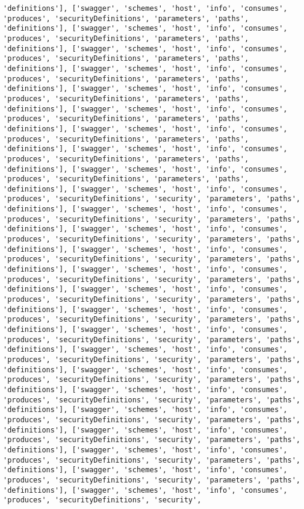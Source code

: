 \documentclass[11pt]{article}
\begin{document}
\begin{Verbatim}[commandchars=\\\{\}]
'definitions'], ['swagger', 'schemes', 'host', 'info', 'consumes', 'produces', 'securityDefinitions', 'parameters', 'paths', 'definitions'], ['swagger', 'schemes', 'host', 'info', 'consumes', 'produces', 'securityDefinitions', 'parameters', 'paths', 'definitions'], ['swagger', 'schemes', 'host', 'info', 'consumes', 'produces', 'securityDefinitions', 'parameters', 'paths', 'definitions'], ['swagger', 'schemes', 'host', 'info', 'consumes', 'produces', 'securityDefinitions', 'parameters', 'paths', 'definitions'], ['swagger', 'schemes', 'host', 'info', 'consumes', 'produces', 'securityDefinitions', 'parameters', 'paths', 'definitions'], ['swagger', 'schemes', 'host', 'info', 'consumes', 'produces', 'securityDefinitions', 'parameters', 'paths', 'definitions'], ['swagger', 'schemes', 'host', 'info', 'consumes', 'produces', 'securityDefinitions', 'parameters', 'paths', 'definitions'], ['swagger', 'schemes', 'host', 'info', 'consumes', 'produces', 'securityDefinitions', 'parameters', 'paths', 'definitions'], ['swagger', 'schemes', 'host', 'info', 'consumes', 'produces', 'securityDefinitions', 'parameters', 'paths', 'definitions'], ['swagger', 'schemes', 'host', 'info', 'consumes', 'produces', 'securityDefinitions', 'security', 'parameters', 'paths', 'definitions'], ['swagger', 'schemes', 'host', 'info', 'consumes', 'produces', 'securityDefinitions', 'security', 'parameters', 'paths', 'definitions'], ['swagger', 'schemes', 'host', 'info', 'consumes', 'produces', 'securityDefinitions', 'security', 'parameters', 'paths', 'definitions'], ['swagger', 'schemes', 'host', 'info', 'consumes', 'produces', 'securityDefinitions', 'security', 'parameters', 'paths', 'definitions'], ['swagger', 'schemes', 'host', 'info', 'consumes', 'produces', 'securityDefinitions', 'security', 'parameters', 'paths', 'definitions'], ['swagger', 'schemes', 'host', 'info', 'consumes', 'produces', 'securityDefinitions', 'security', 'parameters', 'paths', 'definitions'], ['swagger', 'schemes', 'host', 'info', 'consumes', 'produces', 'securityDefinitions', 'security', 'parameters', 'paths', 'definitions'], ['swagger', 'schemes', 'host', 'info', 'consumes', 'produces', 'securityDefinitions', 'security', 'parameters', 'paths', 'definitions'], ['swagger', 'schemes', 'host', 'info', 'consumes', 'produces', 'securityDefinitions', 'security', 'parameters', 'paths', 'definitions'], ['swagger', 'schemes', 'host', 'info', 'consumes', 'produces', 'securityDefinitions', 'security', 'parameters', 'paths', 'definitions'], ['swagger', 'schemes', 'host', 'info', 'consumes', 'produces', 'securityDefinitions', 'security', 'parameters', 'paths', 'definitions'], ['swagger', 'schemes', 'host', 'info', 'consumes', 'produces', 'securityDefinitions', 'security', 'parameters', 'paths', 'definitions'], ['swagger', 'schemes', 'host', 'info', 'consumes', 'produces', 'securityDefinitions', 'security', 'parameters', 'paths', 'definitions'], ['swagger', 'schemes', 'host', 'info', 'consumes', 'produces', 'securityDefinitions', 'security', 'parameters', 'paths', 'definitions'], ['swagger', 'schemes', 'host', 'info', 'consumes', 'produces', 'securityDefinitions', 'security', 'parameters', 'paths', 'definitions'], ['swagger', 'schemes', 'host', 'info', 'consumes', 'produces', 'securityDefinitions', 'security', 
\end{Verbatim}
\end{document}
